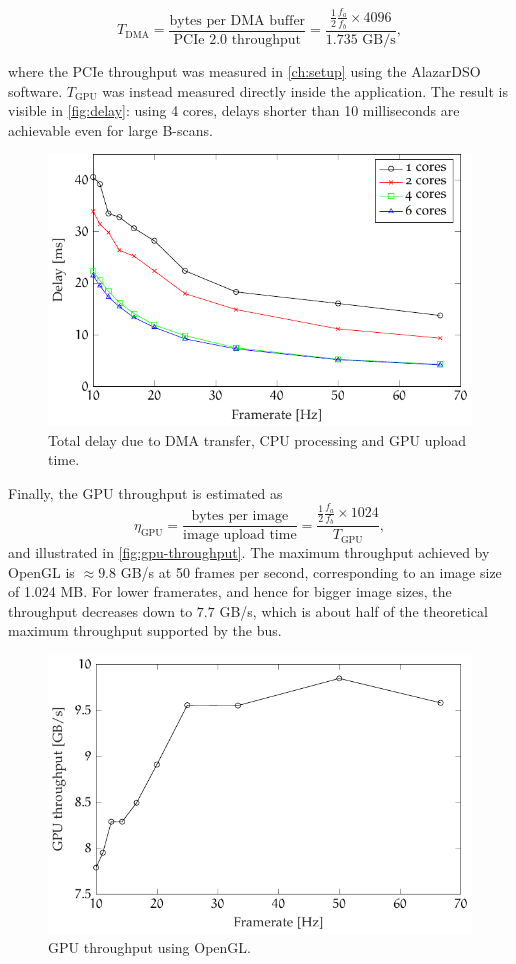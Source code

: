 \begin{equation}
	T_{\text{DMA}} = \frac{\text{bytes per DMA buffer}}{\text{PCIe 2.0 throughput}} = \frac{\frac{1}{2}\frac{f_a}{f_b}\times 4096}{1.735 \text{ GB/s}},
\end{equation} 

where the PCIe throughput was measured in \autoref{ch:setup} using the AlazarDSO software. $T_{\text{GPU}}$ was instead measured directly inside the application. The result is visible in \autoref{fig:delay}: using 4 cores, delays shorter than 10 milliseconds are achievable even for large B-scans. 


\begin{figure}[htb]
	\myfloatalign
	\includegraphics[width=0.8\linewidth]{gfx/ch4/delay}
	\caption{Total delay due to DMA transfer, CPU processing and GPU upload time.}\label{fig:delay}
\end{figure}

Finally, the GPU throughput is estimated as 
\begin{equation}
\eta_{\text{GPU}} = \frac{\text{bytes per image}}{\text{image upload time}} = \frac{\frac{1}{2}\frac{f_a}{f_b} \times 1024}{T_{\text{GPU}}},
\end{equation}
and illustrated in \autoref{fig:gpu-throughput}. The maximum throughput achieved by OpenGL is $\approx 9.8$ GB/s at 50 frames per second, corresponding to an image size of 1.024 MB. For lower framerates, and hence for bigger image sizes, the throughput decreases down to $7.7$ GB/s, which is about half of the theoretical maximum throughput supported by the bus. 
\begin{figure}[htb]
	\myfloatalign
	\includegraphics[width=0.8\linewidth]{gfx/ch4/gpu-throughput}
	\caption{GPU throughput using OpenGL.}\label{fig:gpu-throughput}
\end{figure}


